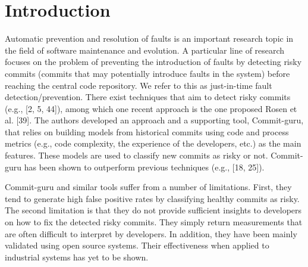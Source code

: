 \documentclass[sigconf]{acmart}
\begin{document}


\maketitle

\section{Introduction}\label{sec:introduction}

Automatic prevention and resolution of faults is an important research
topic in the field of software maintenance and evolution. A particular
line of research focuses on the problem of preventing the introduction
of faults by detecting risky commits (commits that may potentially
introduce faults in the system) before reaching the central code
repository. We refer to this as just-in-time fault detection/prevention.
There exist techniques that aim to detect risky commits (e.g., {[}2, 5,
44{]}), among which one recent approach is the one proposed Rosen et al.
{[}39{]}. The authors developed an approach and a supporting tool,
Commit-guru, that relies on building models from historical commits
using code and process metrics (e.g., code complexity, the experience of
the developers, etc.) as the main features. These models are used to
classify new commits as risky or not. Commit-guru has been shown to
outperform previous techniques (e.g., {[}18, 25{]}).

Commit-guru and similar tools suffer from a number of limitations.
First, they tend to generate high false positive rates by classifying
healthy commits as risky. The second limitation is that they do not
provide sufficient insights to developers on how to fix the detected
risky commits. They simply return measurements that are often difficult
to interpret by developers. In addition, they have been mainly validated
using open source systems. Their effectiveness when applied to
industrial systems has yet to be shown.
\end{document}
